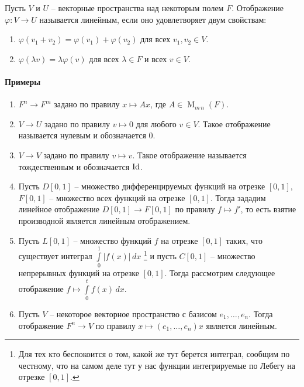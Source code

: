 \begin{definition}
Пусть $V$ и $U$ -- векторные пространства над некоторым полем $F$.
Отображение $\varphi\colon V\to U$ называется линейным, если оно удовлетворяет двум свойствам:
\begin{enumerate}
\item $\varphi(v_1 + v_2) = \varphi(v_1) + \varphi(v_2)$ для всех $v_1,v_2\in V$.

\item $\varphi(\lambda v) = \lambda \varphi(v)$ для всех $\lambda \in F$ и всех $v\in V$.
\end{enumerate}
\end{definition}

\paragraph{Примеры}

\begin{enumerate}
\item $F^n \to F^m$ задано по правилу $x\mapsto Ax$, где $A\in \operatorname{M}_{m\,n}(F)$.

\item $V\to U$ задано по правилу $v\mapsto 0$ для любого $v\in V$.
Такое отображение называется нулевым и обозначается $0$.

\item $V\to V$ задано по правилу $v\mapsto v$.
Такое отображение называется тождественным и обозначается $\operatorname{Id}$.

\item Пусть $D[0,1]$ -- множество дифференцируемых функций на отрезке $[0,1]$, $F[0,1]$ -- множество всех функций на отрезке $[0,1]$.
Тогда зададим линейное отображение $D[0,1]\to F[0,1]$ по правилу $f\mapsto f'$, то есть взятие производной является линейным отображением.

\item Пусть $L[0,1]$ -- множество функций $f$ на отрезке $[0,1]$ таких, что существует интеграл $\int\limits_0^1 |f(x)|\,dx$%
\footnote{Для тех кто беспокоится о том, какой же тут берется интеграл, сообщим по честному, что на самом деле тут у нас функции интегрируемые по Лебегу на отрезке $[0,1]$.}
и пусть $C[0,1]$ -- множество непрерывных функций на отрезке $[0,1]$.
Тогда рассмотрим следующее отображение $f\mapsto \int\limits_0^t f(x)\,dx$.

\item Пусть $V$ -- некоторое векторное пространство с базисом $e_1,\ldots, e_n$.
Тогда отображение $F^n \to V$ по правилу $x \mapsto (e_1,\ldots,e_n)x$ является линейным.
\end{enumerate}

